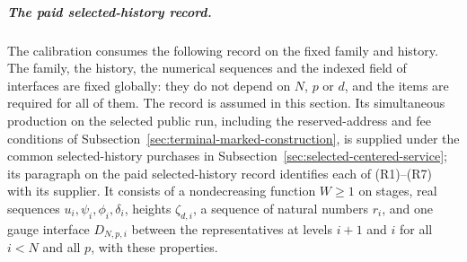 \subparagraph{The paid selected-history record.}
The calibration consumes the following record on the fixed family and
history. The family, the history, the numerical sequences and the indexed
field of interfaces are fixed globally: they do not depend on $N$, $p$ or $d$,
and the items are required for all of them. The record is assumed in this
section. Its simultaneous production on the selected public run,
including the reserved-address and fee conditions of
Subsection~\ref{sec:terminal-marked-construction}, is supplied under the common selected-history purchases in
Subsection~\ref{sec:selected-centered-service}; its paragraph on the paid
selected-history record identifies each of (R1)--(R7) with its supplier. It consists of a
nondecreasing function $W\geq1$ on stages, real sequences
$u_i,\psi_i,\phi_i,\delta_i$, heights $\zeta_{d,i}$, a sequence of
natural numbers $r_i$, and one gauge interface $D_{N,p,i}$ between the
representatives at levels $i+1$ and $i$ for all $i<N$ and all $p$, with
these properties.
